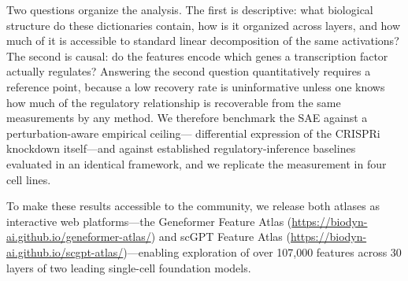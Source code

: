 Two questions organize the analysis. The first is descriptive: what biological structure do these
dictionaries contain, how is it organized across layers, and how much of it is accessible to
standard linear decomposition of the same activations? The second is causal: do the features
encode which genes a transcription factor actually regulates? Answering the second question
quantitatively requires a reference point, because a low recovery rate is uninformative unless one
knows how much of the regulatory relationship is recoverable from the same measurements by any
method. We therefore benchmark the SAE against a perturbation-aware empirical ceiling---
differential expression of the CRISPRi knockdown itself---and against established
regulatory-inference baselines evaluated in an identical framework, and we replicate the
measurement in four cell lines.

To make these results accessible to the community, we release both atlases as interactive web
platforms---the Geneformer Feature Atlas
(\url{https://biodyn-ai.github.io/geneformer-atlas/}) and scGPT Feature Atlas
(\url{https://biodyn-ai.github.io/scgpt-atlas/})---enabling exploration of over 107,000 features
across 30 layers of two leading single-cell foundation models.
